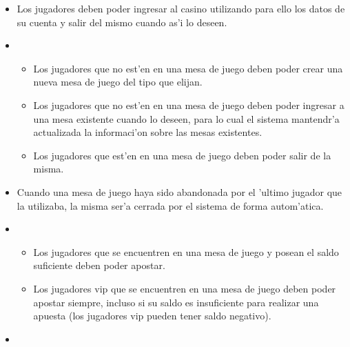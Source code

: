 \begin{itemize}
\item {}

    Los jugadores deben poder ingresar al casino utilizando para ello los datos de su cuenta y salir del mismo cuando as'i lo deseen.
 
\item {}

    \begin{itemize}
        \item Los jugadores que no est'en en una mesa de juego deben poder crear una nueva mesa de juego del tipo que elijan.
        \item Los jugadores que no est'en en una mesa de juego deben poder ingresar a una mesa existente cuando lo deseen, para lo cual el sistema mantendr'a actualizada la informaci'on sobre las mesas existentes.
        \item Los jugadores que est'en en una mesa de juego deben poder salir de la misma.
    \end{itemize}

\item {} 

    Cuando una mesa de juego haya sido abandonada por el 'ultimo jugador que la utilizaba, la misma ser'a cerrada por el sistema de forma autom'atica.

\item {} 

    \begin{itemize}
        \item Los jugadores que se encuentren en una mesa de juego y posean el saldo suficiente deben poder apostar.
        \item Los jugadores vip que se encuentren en una mesa de juego deben poder apostar siempre, incluso si su saldo es insuficiente para realizar una apuesta (los jugadores vip pueden tener saldo negativo).
    \end{itemize}    

\item {}  


\end{itemize}

